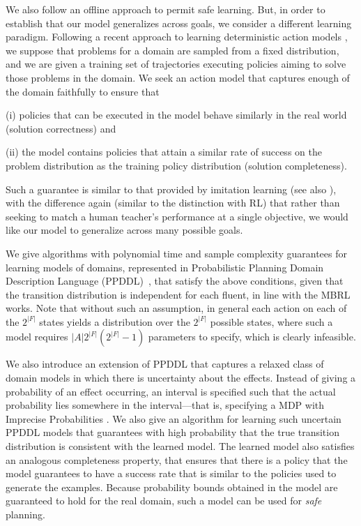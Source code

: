 \documentclass[letterpaper]{article} %
\begin{document}
We also follow an offline approach to permit safe learning. But, in order to establish that our model generalizes across goals, we consider a different learning paradigm. 
Following a recent approach to learning deterministic action models \cite{stern2017efficientAndSafe,juba2021kr}, we suppose that problems for a domain are sampled from a fixed distribution, and we are given a training set of trajectories executing policies aiming to solve those problems in the domain.
We seek an action model that captures enough of the domain faithfully to ensure that
\begin{compactenum}
    \item[(i)] policies that can be executed in the model behave similarly in the real world (solution correctness) and 
    \item[(ii)] the model contains policies that attain a similar rate of success on the problem distribution as the training policy distribution (solution completeness).
\end{compactenum}
Such a guarantee is similar to that provided by imitation learning \cite{osa2018algorithmic} (see also \cite{khardon1999l2act}), with the difference again (similar to the distinction with RL) that rather than seeking to match a human teacher's performance at a single objective, we would like our model to generalize across many possible goals.

We give algorithms with polynomial time and sample complexity guarantees for learning models of domains, represented in Probabilistic Planning Domain Description Language (PPDDL)~\cite{younes2004ppddl1}, that satisfy the above conditions, given that the transition distribution is independent for each fluent, in line with the MBRL works. Note that without such an assumption, in general each action on each of the $2^{|F|}$ states yields a distribution over the $2^{|F|}$ possible states, where such a model requires $|A|2^{|F|}(2^{|F|}-1)$ parameters to specify, which is clearly infeasible.

We also introduce an extension of PPDDL that captures a relaxed class of domain models in which there is uncertainty about the effects. Instead of giving a probability of an effect occurring, an interval is specified such that the actual probability lies somewhere in the interval---that is, specifying a MDP with Imprecise Probabilities \cite{satia1973markovian}. We also give an algorithm for learning such uncertain PPDDL models that guarantees with high probability that the true transition distribution is consistent with the learned model. The learned model also satisfies an analogous completeness property, that ensures that there is a policy that the model guarantees to have a success rate that is similar to the policies used to generate the examples. Because probability bounds obtained in the model are guaranteed to hold for the real domain, such a model can be used for \emph{safe} planning.
\end{document}
